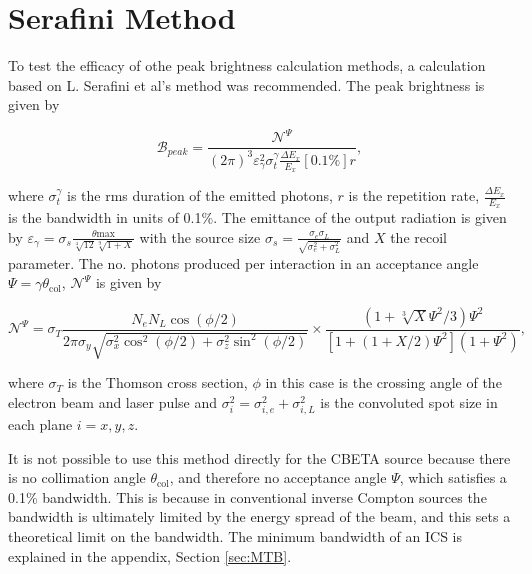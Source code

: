 \documentclass[10pt]{article}
\begin{document}
\section*{Serafini Method}
To test the efficacy of othe peak brightness calculation methods, a calculation based on L. Serafini et al's method \cite{curatolo2017analytical} was recommended. The peak brightness is given by

\begin{equation}
\mathcal{B}_{peak} = \frac{\mathcal{N}^{\Psi}}{\left(2\pi\right)^{3}\varepsilon_{\gamma}^{2}\sigma_{t}^{\gamma}\frac{\Delta E_{x}}{E_{x}}\left[0.1\%\right]r},
\label{eq:SerfPkBrill}
\end{equation}

where $\sigma_{t}^{\gamma}$ is the rms duration of the emitted photons, $r$ is the repetition rate, $\frac{\Delta E_{x}}{E_{x}}$ is the bandwidth in units of 0.1\%. The emittance of the output radiation is given by $\varepsilon_{\gamma} = \sigma_{s}\frac{\theta{\mathrm{max}}}{\sqrt[4]{12}\sqrt[9]{1+X}}$ with the source size $\sigma_{s} = \frac{\sigma_{e}\sigma_{L}}{\sqrt{\sigma_{e}^{2}+\sigma_{L}^{2}}}$ and $X$ the recoil parameter. The no. photons produced per interaction in an acceptance angle $\Psi = \gamma\theta_{\mathrm{col}}$, $\mathcal{N}^{\Psi}$ is given by

\begin{equation}
\mathcal{N}^{\Psi} = \sigma_{T}\frac{N_{e}N_{L}\cos\left(\phi/2\right)}{2\pi\sigma_{y}\sqrt{\sigma_{x}^{2}\cos^{2}\left(\phi/2\right)+\sigma_{z}^{2}\sin^{2}\left(\phi/2\right)}}\times \frac{\left(1+\sqrt[3]{X}\Psi^{2}/3\right)\Psi^{2}}{\left[1+\left(1+X/2\right)\Psi^{2}\right]\left(1+\Psi^{2}\right)},
\label{eqL:SerfFluxBunch}
\end{equation}

where $\sigma_{T}$ is the Thomson cross section, $\phi$ in this case is the crossing angle of the electron beam and laser pulse and $\sigma_{i}^{2} = \sigma_{i,e}^{2}+\sigma_{i,L}^{2}$ is the convoluted spot size in each plane $i = x,y,z$.  
   
It is not possible to use this method directly for the CBETA source because there is no collimation angle $\theta_{\mathrm{col}}$, and therefore no acceptance angle $\Psi$, which satisfies a 0.1\% bandwidth. This is because in conventional inverse Compton sources the bandwidth is ultimately limited by the energy spread of the beam, and this sets a theoretical limit on the bandwidth. The minimum bandwidth of an ICS is explained in the appendix, Section \ref{sec:MTB}.    
   
\end{document}
